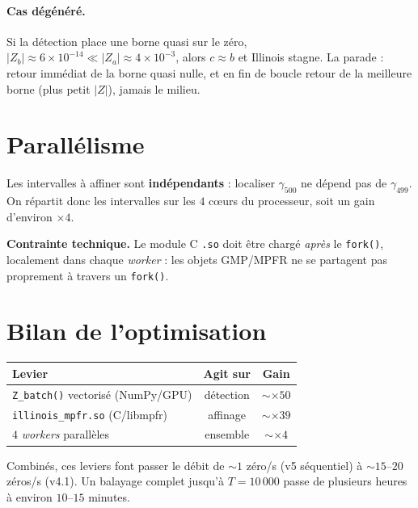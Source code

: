 \documentclass[11pt,a4paper]{article}
\begin{document}
\paragraph{Cas dégénéré.}
Si la détection place une borne quasi sur le zéro,
$|Z_b| \approx 6\times 10^{-14} \ll |Z_a| \approx 4\times 10^{-3}$, alors $c \approx b$
et Illinois stagne. La parade : retour immédiat de la borne quasi nulle, et en fin de boucle
retour de la meilleure borne (plus petit $|Z|$), jamais le milieu.

\section{Parallélisme}

Les intervalles à affiner sont \textbf{indépendants} : localiser $\gamma_{500}$ ne dépend pas
de $\gamma_{499}$. On répartit donc les intervalles sur les $4$ c\oe urs du processeur,
soit un gain d'environ $\times 4$.

\medskip
\noindent\textbf{Contrainte technique.} Le module C \texttt{.so} doit être chargé
\emph{après} le \texttt{fork()}, localement dans chaque \emph{worker} : les objets GMP/MPFR
ne se partagent pas proprement à travers un \texttt{fork()}.

\section{Bilan de l'optimisation}

\begin{center}
\begin{tabular}{lcc}
\toprule
Levier & Agit sur & Gain \\
\midrule
\texttt{Z\_batch()} vectorisé (NumPy/GPU) & détection & $\sim \times 50$ \\
\texttt{illinois\_mpfr.so} (C/libmpfr)    & affinage  & $\sim \times 39$ \\
$4$ \emph{workers} parallèles             & ensemble  & $\sim \times 4$ \\
\bottomrule
\end{tabular}
\end{center}

\noindent
Combinés, ces leviers font passer le débit de $\sim 1$ zéro/s (v5 séquentiel) à
$\sim 15$--$20$ zéros/s (v4.1). Un balayage complet jusqu'à $T=10\,000$ passe de plusieurs
heures à environ $10$--$15$ minutes.

\begin{center}
\end{center}
\end{document}
